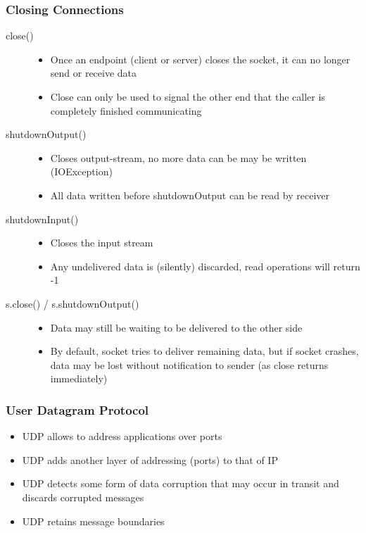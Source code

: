 \documentclass[10pt]{article}
\begin{document}
\subsubsection{Closing Connections}
\begin{description}
	\item[close()] \hfill 
	\begin{itemize}
		\item Once an endpoint (client or server) closes the socket, it can no longer send or receive data	
		\item Close can only be used to signal the other end that the caller is completely finished communicating
	\end{itemize}
	\item[shutdownOutput()] \hfill
	\begin{itemize}
		\item Closes output-stream, no more data can be may be written (IOException)
		\item All data written before shutdownOutput can be read by receiver
	\end{itemize}
	\item[shutdownInput()] \hfill
	\begin{itemize}
		\item Closes the input stream
		\item Any undelivered data is (silently) discarded, read operations will return -1
	\end{itemize}
	\item[s.close() / s.shutdownOutput()] \hfill
	\begin{itemize}
		\item Data may still be waiting to be delivered to the other side
		\item By default, socket tries to deliver remaining data, but if socket crashes, data may be lost without notification to sender (as close returns immediately)
	\end{itemize}
\end{description}
\subsubsection{User Datagram Protocol}
\begin{itemize}
	\item UDP allows to address applications over ports
	\item UDP adds another layer of addressing (ports) to that of IP
	\item UDP detects some form of data corruption that may occur in transit and discards corrupted messages
	\item UDP retains message boundaries
\end{itemize}
\end{document}
